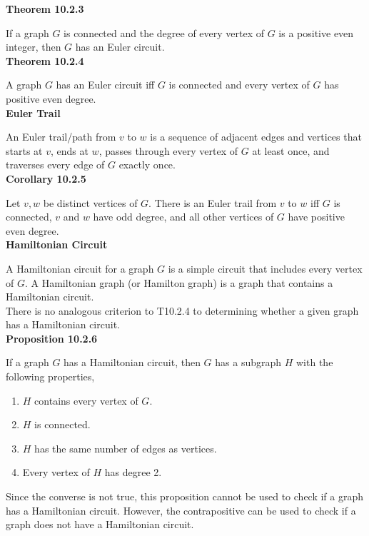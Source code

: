 \documentclass[a4paper]{article}
\newcommand{\subheading}[1]{{\scriptsize\textbf{#1}}}
\begin{document}
\begin{multicols*}{4}
\subheading{Theorem 10.2.3}

If a graph $G$ is connected and the degree of every vertex of $G$ is a positive
even integer, then $G$ has an Euler circuit.\\

\subheading{Theorem 10.2.4}

A graph $G$ has an Euler circuit iff $G$ is connected and every vertex of $G$
has positive even degree.\\

\subheading{Euler Trail}

An Euler trail/path from $v$ to $w$ is a sequence of adjacent edges and
vertices that starts at $v$, ends at $w$, passes through every vertex of $G$ at
least once, and traverses every edge of $G$ exactly once.\\

\subheading{Corollary 10.2.5}

Let $v, w$ be distinct vertices of $G$. There is an Euler trail from $v$ to $w$
iff $G$ is connected, $v$ and $w$ have odd degree, and all other vertices of
$G$ have positive even degree.\\

\subheading{Hamiltonian Circuit}

A Hamiltonian circuit for a graph $G$ is a simple circuit that includes every
vertex of $G$. A Hamiltonian graph (or Hamilton graph) is a graph that contains
a Hamiltonian circuit.\\

There is no analogous criterion to T10.2.4 to determining whether a given graph
has a Hamiltonian circuit.\\

\subheading{Proposition 10.2.6}

If a graph $G$ has a Hamiltonian circuit, then $G$ has a subgraph $H$ with the
following properties,
\begin{enumerate} \itemsep -0.5em
 \item $H$ contains every vertex of $G$.
 \item $H$ is connected.
 \item $H$ has the same number of edges as vertices.
 \item Every vertex of $H$ has degree 2.
\end{enumerate}
Since the converse is not true, this proposition cannot be used to check if a
graph has a Hamiltonian circuit. However, the contrapositive can be used to
check if a graph does not have a Hamiltonian circuit.\\


\end{multicols*}
\end{document}
